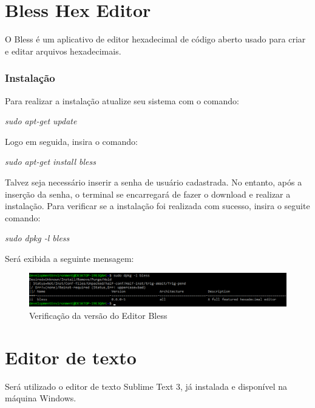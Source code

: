 \documentclass[12pt]{article}
\begin{document}
\section{Bless Hex Editor}

O Bless é um aplicativo de editor hexadecimal de código aberto usado para criar e editar arquivos hexadecimais.

\subsubsection{Instalação}
Para realizar a instalação atualize seu sistema com o comando:

\textit{sudo apt-get update}

Logo em seguida, insira o comando:

\textit{sudo apt-get install bless}

Talvez seja necessário inserir a senha de usuário cadastrada. No entanto, após a inserção da senha, o terminal se encarregará de fazer o download e realizar a instalação.
Para verificar se a instalação foi realizada com sucesso, insira o seguite comando:

\textit{sudo dpkg -l bless}

Será exibida a seguinte mensagem:

\begin{figure}[ht]
\centering
\includegraphics[width=.75\textwidth]{4.png}
\caption{Verificação da versão do Editor Bless}
\label{fig:exampleFig1}
\end{figure}

\section{Editor de texto}

Será utilizado o editor de texto Sublime Text 3, já instalada e disponível na máquina Windows.



\end{document}
